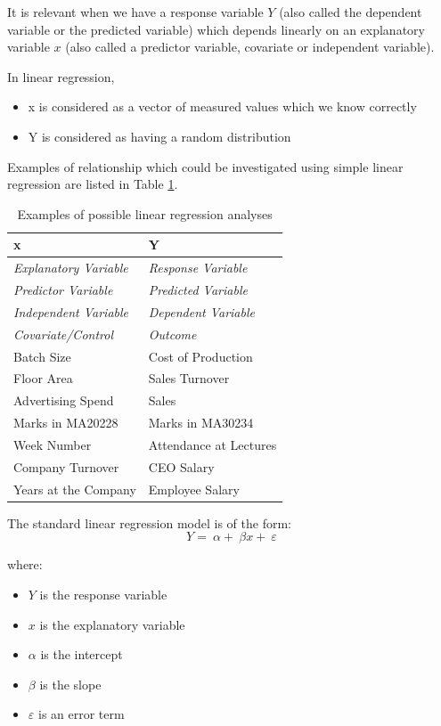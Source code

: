 \documentclass[12pt,a4paper,openany,twoside]{report}
\renewcommand{\emph}[1]{\textcolor{Emerald}{\textit{#1}}}
\theoremstyle{definition}
\theoremstyle{remark}
\theoremstyle{plain}
\theoremstyle{definition}
\theoremstyle{definition}
\theoremstyle{definition}
\theoremstyle{remark}
\begin{document}
It is relevant when we have a response variable \(Y\) (also called the
dependent variable or the predicted variable) which depends linearly on
an explanatory variable \(x\) (also called a predictor variable, covariate or
independent variable).

In linear regression,

\begin{itemize}
\item
  x is considered as a vector of measured values which we know correctly
\item
  Y is considered as having a random distribution
\end{itemize}

Examples of relationship which could be investigated using simple linear regression are listed in Table \ref{tb:simpLin_examples}.

\newpage

\begin{longtable}[c]{@{}p{5cm}p{5cm}@{}}
\caption{Examples of possible linear regression analyses}
\label{tb:simpLin_examples}
\endfirsthead
\endhead
\toprule
\hspace*{\fill}x\hspace*{\fill}  & \hspace*{\fill}Y\hspace*{\fill} \\
\hline
\emph{Explanatory Variable} &  \emph{Response Variable} \\
\emph{Predictor Variable} &  \emph{Predicted Variable} \\
\emph{Independent Variable} &  \emph{Dependent Variable} \\
\emph{Covariate/Control} &  \emph{Outcome} \\
\midrule
Batch Size &  Cost of Production\tabularnewline
Floor Area &  Sales Turnover\tabularnewline
Advertising Spend &  Sales\tabularnewline
Marks in MA20228 &  Marks in MA30234\tabularnewline
Week Number &  Attendance at Lectures\tabularnewline
Company Turnover &  CEO Salary\tabularnewline
Years at the Company &  Employee Salary\tabularnewline
\bottomrule
\end{longtable}

The standard linear regression model is of the form:
\begin{equation}
Y = \ \alpha + \ \beta x + \ \varepsilon
\end{equation}

where:

\begin{itemize}
\item
  \(Y\) is the response variable
\item
  \(x\) is the explanatory variable
\item
  \(\alpha\) is the intercept
\item
  \(\beta\) is the slope
\item
  \(\varepsilon\) is an error term
\end{itemize}
\end{document}
